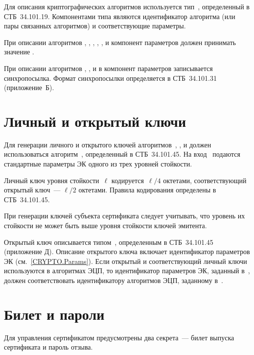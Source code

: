 Для описания криптографических алгоритмов используется 
тип~, определенный в СТБ~34.101.19.
Компонентами типа являются идентификатор алгоритма (или пары 
связанных алгоритмов) и соответствующие параметры. 

При описании алгоритмов 
, , ,
, , 
 и  компонент параметров 
должен принимать значение .

При описании алгоритмов , ,  и
 в компонент параметров записывается синхропосылка. Формат
синхропосылки определяется в СТБ~34.101.31 (приложение~Б).

\section{Личный и открытый ключи}\label{CRYPTO.Keypair}

Для генерации личного и открытого ключей алгоритмов~, 
,  и 
 должен использоваться 
алгоритм~, определенный в СТБ~34.101.45. 
%
На вход~ подаются стандартные параметры ЭК одного 
из трех уровней стойкости. 

Личный ключ уровня стойкости~$\ell$ кодируется~$\ell/4$ октетами,
соответствующий открытый ключ~--- $\ell/2$ октетами.
Правила кодирования определены в СТБ~34.101.45.

При генерации ключей субъекта сертификата следует учитывать, что 
уровень их стойкости не может быть выше уровня стойкости ключей эмитента.

Открытый ключ описывается типом~, 
определенным в СТБ~34.101.45 (приложение Д).
%
Описание открытого ключа включает идентификатор параметров ЭК 
(см.~\ref{CRYPTO.Params}). 
%
Если открытый и соответствующий личный ключи используются в алгоритмах 
ЭЦП, то идентификатор параметров ЭК, заданный в~,
должен соответствовать идентификатору алгоритмов ЭЦП, заданному 
в~.

\section{Билет и пароли}\label{CRYPTO.Pwd}

Для управления сертификатом предусмотрены два секрета~---
билет выпуска сертификата и пароль отзыва. 

